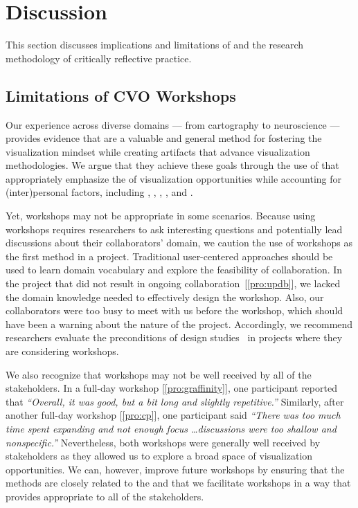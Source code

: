 \section{Discussion}
\label{sec:discussion}

This section discusses implications and limitations of \workshops and the research methodology of critically reflective practice.

\subsection{Limitations of CVO Workshops}

Our experience across diverse domains --- from cartography to neuroscience --- provides evidence that \workshops are a valuable and general method for fostering the visualization mindset while creating artifacts that advance visualization methodologies. We argue that they achieve these goals through the use of \methods that appropriately emphasize the \topic of visualization opportunities while accounting for (inter)personal factors, including \agency, \collegiality, \challenge, \interest, and \trust. 

Yet, workshops may not be appropriate in some scenarios. Because using workshops requires researchers to ask interesting questions and potentially lead discussions about their collaborators' domain, we caution the use of workshops as the first method in a project. Traditional user-centered approaches should be used to learn domain vocabulary and explore the feasibility of collaboration. In the project that did not result in ongoing collaboration~[\ref{pro:updb}], we lacked the domain knowledge needed to effectively design the workshop. Also, our collaborators were too busy to meet with us before the workshop, which should have been a warning about the nature of the project. Accordingly, we recommend researchers evaluate the preconditions of design studies~\cite{Sedlmair2012} in projects where they are considering workshops.

We also recognize that workshops may not be well received by all of the stakeholders. In a full-day workshop [\ref{pro:graffinity}], one participant reported that {\it ``Overall, it was good, but a bit long and slightly repetitive.''} Similarly, after another full-day workshop [\ref{pro:cp}], one participant said {\it ``There was too much time spent expanding and not enough focus \ldots discussions were too shallow and nonspecific.''} Nevertheless, both workshops were generally well received by stakeholders as they allowed us to explore a broad space of visualization opportunities. We can, however, improve future workshops by ensuring that the methods are closely related to the \topic and that we facilitate workshops in a way that provides appropriate \agency to all of the stakeholders.

